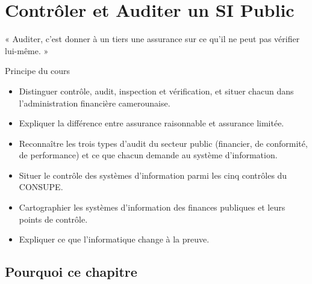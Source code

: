 
\chapter{Contrôler et Auditer un SI Public}
\label{chap:audit-public}

\epigraph{%
    « Auditer, c'est donner à un tiers une assurance sur ce qu'il ne peut
    pas vérifier lui-même. »%
}{Principe du cours}


\begin{boxobjectifs}
\begin{itemize}
    \item Distinguer contrôle, audit, inspection et vérification, et situer
          chacun dans l'administration financière camerounaise.
    \item Expliquer la différence entre assurance raisonnable et assurance
          limitée.
    \item Reconnaître les trois types d'audit du secteur public (financier,
          de conformité, de performance) et ce que chacun demande au
          système d'information.
    \item Situer le contrôle des systèmes d'information parmi les cinq
          contrôles du CONSUPE.
    \item Cartographier les systèmes d'information des finances publiques et
          leurs points de contrôle.
    \item Expliquer ce que l'informatique change à la preuve.
\end{itemize}
\end{boxobjectifs}

\bigskip

\section*{Pourquoi ce chapitre}

